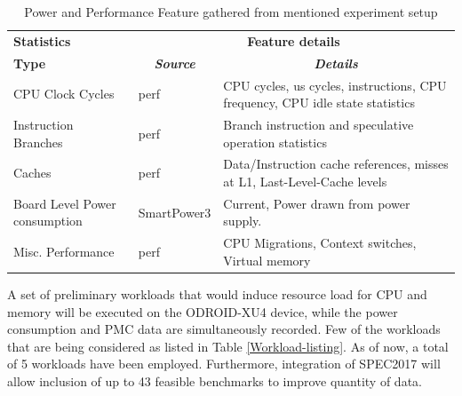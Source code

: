 \documentclass[conference]{IEEEtran}
\begin{document}
        \begin{table}[htbp]
            \caption{Power and Performance Feature gathered from mentioned experiment setup}
            \begin{center}
                \begin{tabular}{|p{1.8cm}|p{1.5cm}|p{3.7cm}|}
                    \hline
                    \textbf{Statistics}&\multicolumn{2}{|c|}{\textbf{Feature details}} \\
                    \cline{2-3} 
                    \textbf{Type} & \multicolumn{1}{|c|}{\textbf{\textit{Source}}} & \multicolumn{1}{|c|}{\textbf{\textit{Details}}} \\
                    \hline
                    CPU Clock Cycles  & perf\cite{2015137}  & CPU cycles, us cycles, instructions, CPU frequency, CPU idle state statistics \\
                    \hline
                    Instruction Branches  & perf & Branch instruction and speculative operation statistics \\
                    \hline
                    Caches   & perf  & Data/Instruction cache references, misses at L1, Last-Level-Cache levels  \\
                    \hline
                    Board Level Power consumption & SmartPower3\cite{odroid-smartpower3} & Current, Power drawn from power supply. \\
                    \hline
                    Misc. Performance  & perf  & CPU Migrations, Context switches, Virtual memory \\
                    \hline
                \end{tabular}
                \label{Power-Perf-data-gathered}
            \end{center}
        \end{table}

        \par A set of preliminary workloads that would induce resource load for CPU and memory will be executed on the ODROID-XU4 device, while the power consumption and PMC data are simultaneously recorded. Few of the workloads that are being considered as listed in Table \ref{Workload-listing}. As of now, a total of 5 workloads have been employed. Furthermore, integration of SPEC2017 will allow inclusion of up to 43 feasible benchmarks to improve quantity of data.
\end{document}
